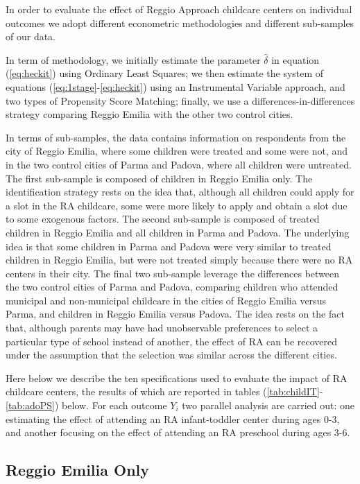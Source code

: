\documentclass[12pt]{article}
\begin{document}
In order to evaluate the effect of Reggio Approach childcare centers on individual outcomes we adopt different econometric methodologies and different sub-samples of our data.

In term of methodology, we initially estimate the parameter $\hat{\delta}$ in equation (\ref{eq:heckit}) using Ordinary Least Squares; we then estimate the system of equations (\ref{eq:1stage}-\ref{eq:heckit}) using an Instrumental Variable approach, and two types of Propensity Score Matching; finally, we use a differences-in-differences strategy comparing Reggio Emilia with the other two control cities.




In terms of sub-samples, the data contains information on respondents from the city of Reggio Emilia, where some children were treated and some were not, and in the two control cities of Parma and Padova, where all children were untreated. The first sub-sample is composed of children in Reggio Emilia only. The identification strategy rests on the idea that, although all children could apply for a slot in the RA childcare, some were more likely to apply and obtain a slot due to some exogenous factors. The second sub-sample is composed of treated children in Reggio Emilia and all children in Parma and Padova. The underlying idea is that some children in Parma and Padova were very similar to treated children in Reggio Emilia, but were not treated simply because there were no RA centers in their city. The final two sub-sample leverage the differences between the two control cities of Parma and Padova, comparing children who attended municipal and non-municipal childcare in the cities of Reggio Emilia versus Parma, and children in Reggio Emilia versus Padova. The idea rests on the fact that, although parents may have had unobservable preferences to select a particular type of school instead of another, the effect of RA can be recovered under the assumption that the selection was similar across the different cities.

Here below we describe the ten specifications used to evaluate the impact of RA childcare centers, the results of which are reported in tables (\ref{tab:childIT}-\ref{tab:adoPS}) below. For each outcome $Y_{i}$ two parallel analysis are carried out: one estimating the effect of attending an RA infant-toddler center during ages 0-3, and another focusing on the effect of attending an RA preschool during ages 3-6.

\subsection{Reggio Emilia Only}
\end{document}
